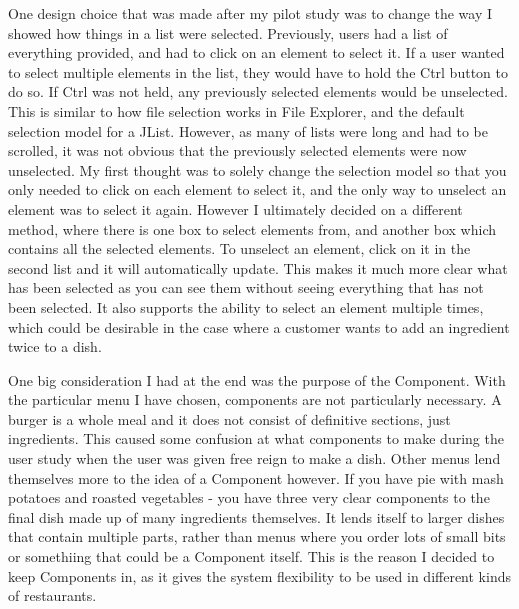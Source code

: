 One design choice that was made after my pilot study was to change the way I showed how things in a list were selected. Previously, users had a list of everything provided, and had to click on an element to select it. If a user wanted to select multiple elements in the list, they would have to hold the Ctrl button to do so. If Ctrl was not held, any previously selected elements would be unselected. This is similar to how file selection works in File Explorer, and the default selection model for a JList. However, as many of lists were long and had to be scrolled, it was not obvious that the previously selected elements were now unselected. My first thought was to  solely change the selection model so that you only needed to click on each element to select it, and the only way to unselect an element was to select it again. However I ultimately decided on a different method, where there is one box to select elements from, and another box which contains all the selected elements. To unselect an element, click on it in the second list and it will automatically update. This makes it much more clear what has been selected as you can see them without seeing everything that has not been selected. It also supports the ability to select an element multiple times, which could be desirable in the case where a customer wants to add an ingredient twice to a dish.

One big consideration I had at the end was the purpose of the Component. With the particular menu I have chosen, components are not particularly necessary. A burger is a whole meal and it does not consist of definitive sections, just ingredients. This caused some confusion at what components to make during the user study when the user was given free reign to make a dish.  Other menus lend themselves more to the idea of a Component however. If you have pie with mash potatoes and roasted vegetables - you have three very clear components to the final dish made up of many ingredients themselves. It lends itself to larger dishes that contain multiple parts, rather than menus where you order lots of small bits or somethiing that could be a Component itself. This is the reason I decided to keep Components in, as it gives the system flexibility to be used in different kinds of restaurants.

